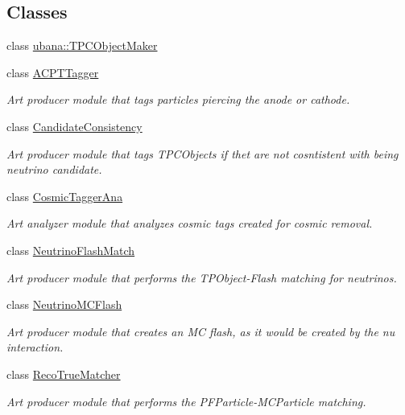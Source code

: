 \subsection*{Classes}
\begin{DoxyCompactItemize}
\item 
class \hyperlink{classubana_1_1TPCObjectMaker}{ubana\-::\-T\-P\-C\-Object\-Maker}
\item 
class \hyperlink{classACPTTagger}{A\-C\-P\-T\-Tagger}
\begin{DoxyCompactList}\small\item\em Art producer module that tags particles piercing the anode or cathode. \end{DoxyCompactList}\item 
class \hyperlink{classCandidateConsistency}{Candidate\-Consistency}
\begin{DoxyCompactList}\small\item\em Art producer module that tags T\-P\-C\-Objects if thet are not cosntistent with being neutrino candidate. \end{DoxyCompactList}\item 
class \hyperlink{classCosmicTaggerAna}{Cosmic\-Tagger\-Ana}
\begin{DoxyCompactList}\small\item\em Art analyzer module that analyzes cosmic tags created for cosmic removal. \end{DoxyCompactList}\item 
class \hyperlink{classNeutrinoFlashMatch}{Neutrino\-Flash\-Match}
\begin{DoxyCompactList}\small\item\em Art producer module that performs the T\-P\-Object-\/\-Flash matching for neutrinos. \end{DoxyCompactList}\item 
class \hyperlink{classNeutrinoMCFlash}{Neutrino\-M\-C\-Flash}
\begin{DoxyCompactList}\small\item\em Art producer module that creates an M\-C flash, as it would be created by the nu interaction. \end{DoxyCompactList}\item 
class \hyperlink{classRecoTrueMatcher}{Reco\-True\-Matcher}
\begin{DoxyCompactList}\small\item\em Art producer module that performs the P\-F\-Particle-\/\-M\-C\-Particle matching. \end{DoxyCompactList}\item 

\end{DoxyCompactItemize}
